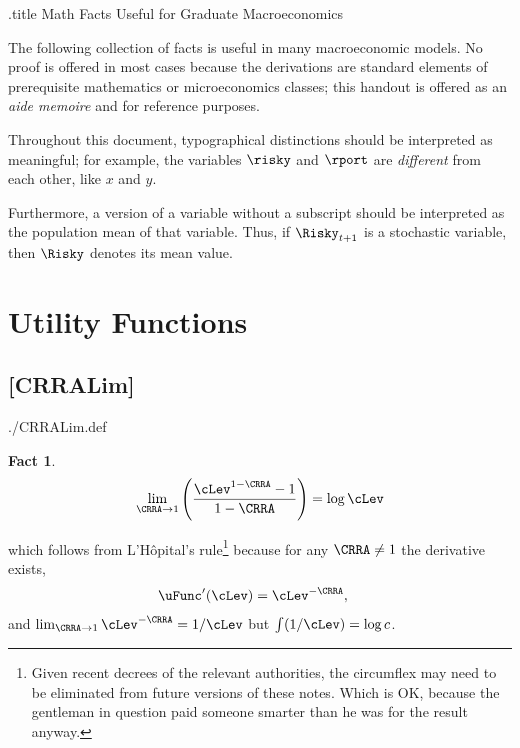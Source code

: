 \message{ !name(MathFactsList.tex)}\documentclass{handout}
\newtheorem{Fact}{Fact}
\begin{document}


\handoutHeader


\begin{verbatimwrite}{\jobname.title}
Math Facts Useful for Graduate Macroeconomics
\end{verbatimwrite}

\handoutNameMake 

The following collection of facts is useful in many macroeconomic
models.  No proof is offered in most cases because the derivations
are standard elements of prerequisite mathematics or microeconomics classes;
this handout is offered as an {\it aide memoire} and for reference purposes.

Throughout this document, typographical distinctions should be interpreted as 
meaningful; for example, the variables $\risky$ and $\rport$ are {\it different} from 
each other, like $x$ and $y$.

Furthermore, a version of a variable without a subscript should be interpreted as 
the population mean of that variable.  Thus, if $\Risky_{t+1}$ is a stochastic
variable, then $\Risky$ denotes its mean value.


\section{{Utility Functions}}


\hypertarget{CRRALim}{}
\subsection{{[CRRALim]}}\label{CRRALim} 

\begin{verbatimwrite}{./CRRALim.def}
\providecommand{\CRRALim}{\href{https://www.econ2.jhu.edu/people/ccarroll/public/LectureNotes/MathFacts/MathFactsList\#CRRALim}{\ensuremath{\mathtt{[CRRALim]}}}}
\end{verbatimwrite}

\begin{Fact} \label{fact:CRRALim} 
\begin{equation}
\lim_{\CRRA \rightarrow 1} \left(\frac{\cLev^{1-\CRRA}-1}{1-\CRRA}\right) = \log \cLev
\end{equation}
\end{Fact}
\noindent which follows from L'H\^{o}pital's rule\footnote{Given recent decrees of the relevant authorities, the circumflex may need to be eliminated from future versions of these notes.  Which is OK, because the gentleman in question paid someone smarter than he was for the result anyway.}  because for any $\CRRA \neq 1$ the derivative exists,
\begin{equation}\begin{gathered}\begin{aligned}
  \uFunc^{\prime}(\cLev) & =  \cLev^{-\CRRA},
\end{aligned}\end{gathered}\end{equation}
and $\lim_{\CRRA \rightarrow 1} \cLev^{-\CRRA} = 1/\cLev$ but $\int (1/\cLev) = \log c$.
\end{document}
